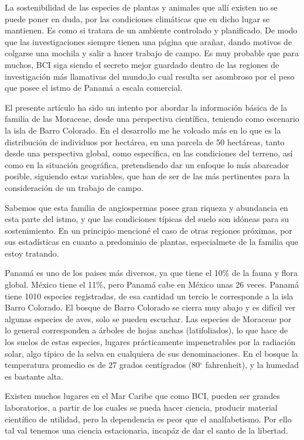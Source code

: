 \documentclass[11pt,]{article}
\begin{document}
La sostenibilidad de las especies de plantas y animales que allí existen
no se puede poner en duda, por las condiciones climáticas que en dicho
lugar se mantienen. Es como si tratara de un ambiente controlado y
planificado. De modo que las investigaciones siempre tienen una página
que arañar, dando motivos de colgarse una mochila y salir a hacer
trabajo de campo. Es muy probable que para muchos, BCI siga siendo el
secreto mejor guardado dentro de las regiones de investigación más
llamativas del mundo,lo cual resulta ser asombroso por el peso que posee
el istmo de Panamá a escala comercial.

El presente artículo ha sido un intento por abordar la información
básica de la familia de las Moraceae, desde una perspectiva científica,
teniendo como escenario la isla de Barro Colorado. En el desarrollo me
he volcado más en lo que es la distribución de individuos por hectárea,
en una parcela de 50 hectáreas, tanto desde una perspectiva global, como
específica, en las condiciones del terreno, así como en la situación
geográfica, pretendiendo dar un enfoque lo más abarcador posible,
siguiendo estas variables, que han de ser de las más pertinentes para la
consideración de un trabajo de campo.

Sabemos que esta familia de angiospermas posee gran riqueza y abundancia
en esta parte del istmo, y que las condiciones típicas del suelo son
idóneas para su sostenimiento. En un principio mencioné el caso de otras
regiones próximas, por sus estadísticas en cuanto a predominio de
plantas, especialmete de la familia que estoy tratando.

Panamá es uno de los paises más diversos, ya que tiene el 10\% de la
fauna y flora global. México tiene el 11\%, pero Panamá cabe en México
unas 26 veces. Panamá tiene 1010 especies registradas, de esa cantidad
un tercio le corresponde a la isla Barro Colorado. El bosque de Barro
Colorado se cierra muy abajo y es difícil ver algunas especies de aves,
solo se pueden escuchar. Las especies de Moraceae por lo general
corresponden a árboles de hojas anchas (latifoliados), lo que hace de
los suelos de estas especies, lugares prácticamente impenetrables por la
radiación solar, algo típico de la selva en cualquiera de sus
denominaciones. En el bosque la temperatura promedio es de 27 grados
centígrados (80\(^\circ\) fahrenheit), y la humedad es bastante alta.

Existen muchos lugares en el Mar Caribe que como BCI, pueden ser grandes
laboratorios, a partir de los cuales se pueda hacer ciencia, producir
material científico de utilidad, pero la dependencia es peor que el
analfabetismo. Por ello tal val tenemos una ciencia estacionaria,
incapáz de dar el santo de la libertad.
\end{document}
